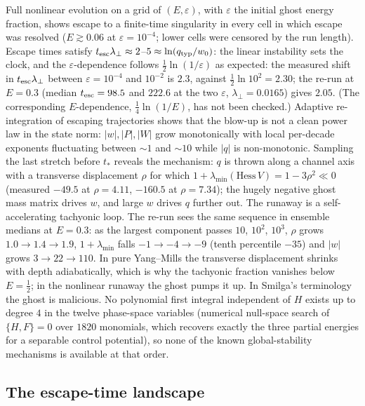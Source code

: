 \documentclass[11pt,a4paper]{article}
\newcommand{\Hess}{\mathrm{Hess}\,}
\newcommand{\esc}{{\rm esc}}
\begin{document}
Full nonlinear evolution on a grid of $(E,\varepsilon)$, with $\varepsilon$ the initial ghost
energy fraction, shows escape to a finite-time singularity in every cell in which escape was
resolved ($E\gtrsim0.06$ at $\varepsilon=10^{-4}$; lower cells were censored by the run length).
Escape times satisfy $t_\esc\lambda_\perp\approx2$--$5\approx\ln(q_{\rm typ}/w_0)$: the linear
instability sets the clock, and the $\varepsilon$-dependence follows
$\tfrac12\ln(1/\varepsilon)$ as expected: the measured shift in $t_\esc\lambda_\perp$ between
$\varepsilon=10^{-4}$ and $10^{-2}$ is $2.3$, against $\tfrac12\ln10^2=2.30$; the re-run at
$E=0.3$ (median $t_\esc=98.5$ and $222.6$ at the two $\varepsilon$, $\lambda_\perp=0.0165$)
gives $2.05$. (The corresponding $E$-dependence, $\tfrac14\ln(1/E)$, has not been checked.)
Adaptive re-integration of escaping trajectories shows that the blow-up is not a clean power law
in the state norm: $|w|,|P|,|W|$ grow monotonically with local per-decade exponents fluctuating
between $\sim1$ and $\sim10$ while $|q|$ is non-monotonic. Sampling the last stretch before
$t_*$ reveals the mechanism: $q$ is thrown along a channel axis with a transverse displacement
$\rho$ for which $1+\lambda_{\min}(\Hess V)=1-3\rho^2\ll0$ (measured $-49.5$ at $\rho=4.11$,
$-160.5$ at $\rho=7.34$); the hugely negative ghost mass matrix drives $w$, and large $w$ drives
$q$ further out. The runaway is a self-accelerating tachyonic loop. The re-run sees the same
sequence in ensemble medians at $E=0.3$: as the largest component passes $10$, $10^2$, $10^3$,
$\rho$ grows $1.0\to1.4\to1.9$, $1+\lambda_{\min}$ falls $-1\to-4\to-9$ (tenth percentile
$-35$) and $|w|$ grows $3\to22\to110$. In pure Yang--Mills the
transverse displacement shrinks with depth adiabatically, which is why the tachyonic fraction
vanishes below $E=\tfrac12$; in the nonlinear runaway the ghost pumps it up. In Smilga's
terminology \cite{Smilga} the ghost is malicious. No polynomial first integral independent of $H$ exists up to degree $4$ in the twelve
phase-space variables (numerical null-space search of $\{H,F\}=0$ over $1820$ monomials, which
recovers exactly the three partial energies for a separable control potential), so none of the
known global-stability mechanisms \cite{DMV22,KLS14} is available at that order.

\subsection{The escape-time landscape}
\end{document}

